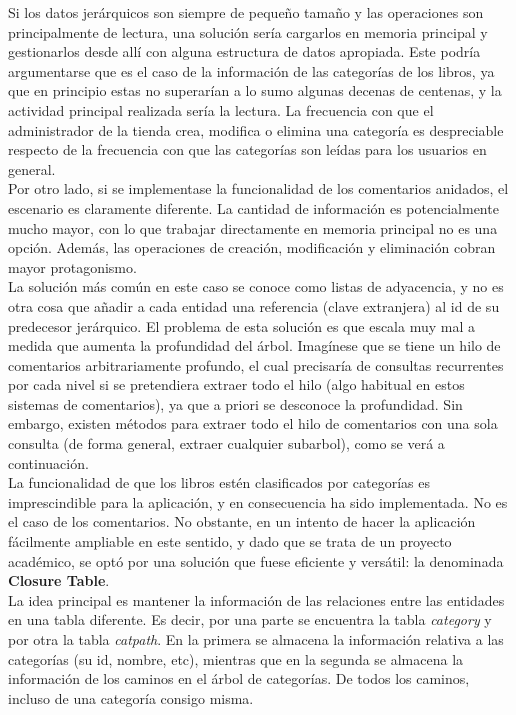 \documentclass[a4paper]{report}
\begin{document}
    Si los datos jerárquicos son siempre de pequeño tamaño y las operaciones son principalmente de lectura, una solución sería cargarlos en memoria principal y gestionarlos desde allí con alguna estructura de datos apropiada. Este podría argumentarse que es el caso de la información de las categorías de los libros, ya que en principio estas no superarían a lo sumo algunas decenas de centenas, y la actividad principal realizada sería la lectura. La frecuencia con que el administrador de la tienda crea, modifica o elimina una categoría es despreciable respecto de la frecuencia con que las categorías son leídas para los usuarios en general.
    \\
    
    Por otro lado, si se implementase la funcionalidad de los comentarios anidados, el escenario es claramente diferente. La cantidad de información es potencialmente mucho mayor, con lo que trabajar directamente en memoria principal no es una opción. Además, las operaciones de creación, modificación y eliminación cobran mayor protagonismo.
    \\
    
    La solución más común en este caso se conoce como listas de adyacencia, y no es otra cosa que añadir a cada entidad una referencia (clave extranjera) al id de su predecesor jerárquico. El problema de esta solución es que escala muy mal a medida que aumenta la profundidad del árbol. Imagínese que se tiene un hilo de comentarios arbitrariamente profundo, el cual precisaría de consultas recurrentes por cada nivel si se pretendiera extraer todo el hilo (algo habitual en estos sistemas de comentarios), ya que a priori se desconoce la profundidad. Sin embargo, existen métodos para extraer todo el hilo de comentarios con una sola consulta (de forma general, extraer cualquier subarbol), como se verá a continuación.
    \\
    
    La funcionalidad de que los libros estén clasificados por categorías es imprescindible para la aplicación, y en consecuencia ha sido implementada. No es el caso de los comentarios. No obstante, en un intento de hacer la aplicación fácilmente ampliable en este sentido, y dado que se trata de un proyecto académico, se optó por una solución que fuese eficiente y versátil: la denominada \textbf{Closure Table}.
    \\
    
    La idea principal es mantener la información de las relaciones entre las entidades en una tabla diferente. Es decir, por una parte se encuentra la tabla \emph{category} y por otra la tabla \emph{catpath}. En la primera se almacena la información relativa a las categorías (su id, nombre, etc), mientras que en la segunda se almacena la información de los caminos en el árbol de categorías. De todos los caminos, incluso de una categoría consigo misma.
    \\
    
\end{document}
